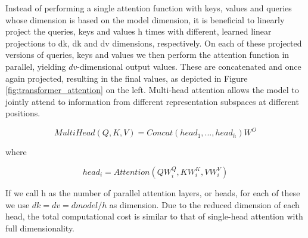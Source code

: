 Instead of performing a single attention function with keys, values and queries whose dimension is based on the model dimension, it is beneficial to linearly project the queries, keys and values h times with different, learned linear projections to dk, dk and dv dimensions, respectively. On each of these projected versions of queries, keys and values we then perform the attention function in parallel, yielding $dv$-dimensional output values. These are concatenated and once again projected, resulting in the final values, as depicted in Figure \ref{fig:transformer_attention} on the left.
Multi-head attention allows the model to jointly attend to information from different representation subspaces at different positions.
\begin{large}
$$MultiHead(Q, K, V ) = Concat(head_{1}, ..., head_{h})W^O$$
\begin{center}where\end{center}
$$head_{i} = Attention(QW^Q_{i}, KW^K_{i}, VW^V_{i})$$
\end{large}
If we call h as the number of parallel attention layers, or heads, for each of these we use $dk=dv=dmodel/h$ as dimension. Due to the reduced dimension of each head, the total computational cost is similar to that of single-head attention with full dimensionality.

